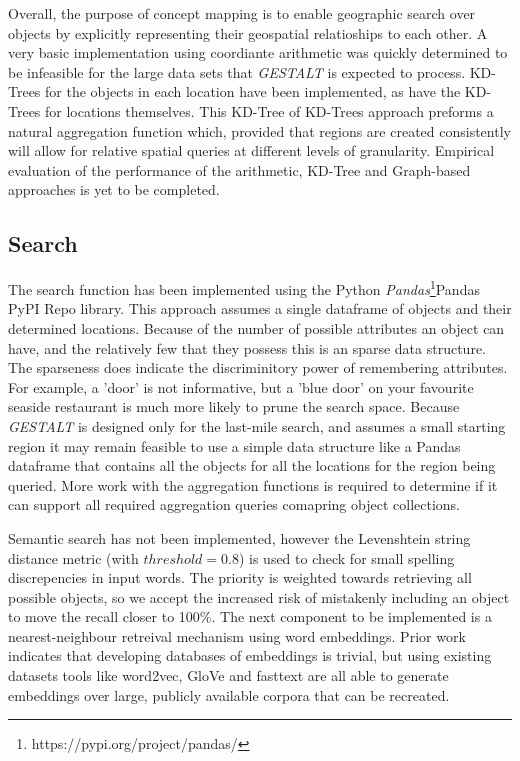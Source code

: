 Overall, the purpose of concept mapping is to enable geographic search over objects by explicitly representing their geospatial relatioships to each other. 
A very basic implementation using coordiante arithmetic was quickly determined to be infeasible for the large data sets that \textit{GESTALT} is expected to process. 
KD-Trees for the objects in each location have been implemented, as have the KD-Trees for locations themselves. 
This KD-Tree of KD-Trees approach preforms a natural aggregation function which, provided that regions are created consistently will allow for relative spatial queries at different levels of granularity. 
Empirical evaluation of the performance of the arithmetic, KD-Tree and Graph-based approaches is yet to be completed. 

\subsection{Search}
The search function has been implemented using the Python \textit{Pandas}\footnote{https://pypi.org/project/pandas/}{Pandas PyPI Repo} library. 
This approach assumes a single dataframe of objects and their determined locations. Because of the number of possible attributes an object can have, and the relatively few that they possess this is an sparse data structure. 
The sparseness does indicate the discriminitory power of remembering attributes. For example, a 'door' is not informative, but a 'blue door' on your favourite seaside restaurant is much more likely to prune the search space. 
Because \textit{GESTALT} is designed only for the last-mile search, and assumes a small starting region it may remain feasible to use a simple data structure like a Pandas dataframe that contains all the objects for all the locations for the region being queried. 
More work with the aggregation functions is required to determine if it can support all required aggregation queries comapring object collections. 

Semantic search has not been implemented, however the Levenshtein string distance metric (with $threshold = 0.8$) is used to check for small spelling discrepencies in input words. The priority is weighted towards retrieving all possible objects, so we accept the increased risk of mistakenly including an object to move the recall closer to 100\%. The next component to be implemented is a nearest-neighbour retreival mechanism using word embeddings. Prior work indicates that developing databases of embeddings is trivial\cite{Mueller2012}, but using existing datasets tools like word2vec, GloVe and fasttext are all able to generate embeddings over large, publicly available corpora that can be recreated. 

